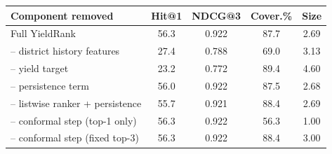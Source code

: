 \begin{tabular}{lcccc}
\toprule
Component removed & Hit@1 & NDCG@3 & Cover.\% & Size \\
\midrule
Full YieldRank & 56.3 & 0.922 & 87.7 & 2.69 \\
-- district history features & 27.4 & 0.788 & 69.0 & 3.13 \\
-- yield target & 23.2 & 0.772 & 89.4 & 4.60 \\
-- persistence term & 56.0 & 0.922 & 87.5 & 2.68 \\
-- listwise ranker + persistence & 55.7 & 0.921 & 88.4 & 2.69 \\
-- conformal step (top-1 only) & 56.3 & 0.922 & 56.3 & 1.00 \\
-- conformal step (fixed top-3) & 56.3 & 0.922 & 88.4 & 3.00 \\
\bottomrule
\end{tabular}
